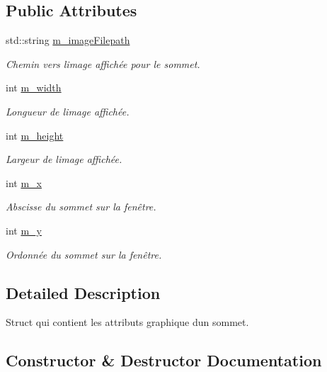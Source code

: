 \subsection*{Public Attributes}
\begin{DoxyCompactItemize}
\item 
std\+::string \mbox{\hyperlink{struct_node_gui_attr_ae8361faefecd978e2a749e0e838af86b}{m\+\_\+image\+Filepath}}
\begin{DoxyCompactList}\small\item\em Chemin vers l\textquotesingle{}image affichée pour le sommet. \end{DoxyCompactList}\item 
int \mbox{\hyperlink{struct_node_gui_attr_ad9b18df17570cefcd755bcee9d7d3cdb}{m\+\_\+width}}
\begin{DoxyCompactList}\small\item\em Longueur de l\textquotesingle{}image affichée. \end{DoxyCompactList}\item 
int \mbox{\hyperlink{struct_node_gui_attr_aad75cafcb74b64f13842efc6b3c755d1}{m\+\_\+height}}
\begin{DoxyCompactList}\small\item\em Largeur de l\textquotesingle{}image affichée. \end{DoxyCompactList}\item 
int \mbox{\hyperlink{struct_node_gui_attr_a1e4e5581cf2ed1f47398a14a65d4598f}{m\+\_\+x}}
\begin{DoxyCompactList}\small\item\em Abscisse du sommet sur la fenêtre. \end{DoxyCompactList}\item 
int \mbox{\hyperlink{struct_node_gui_attr_aa0e7b15590cc2a32cb82799770298975}{m\+\_\+y}}
\begin{DoxyCompactList}\small\item\em Ordonnée du sommet sur la fenêtre. \end{DoxyCompactList}\end{DoxyCompactItemize}


\subsection{Detailed Description}
Struct qui contient les attributs graphique d\textquotesingle{}un sommet. 

\subsection{Constructor \& Destructor Documentation}
\mbox{\label{struct_node_gui_attr_a97f0593ab84f42b7bd691d6715ccf20f}} 
